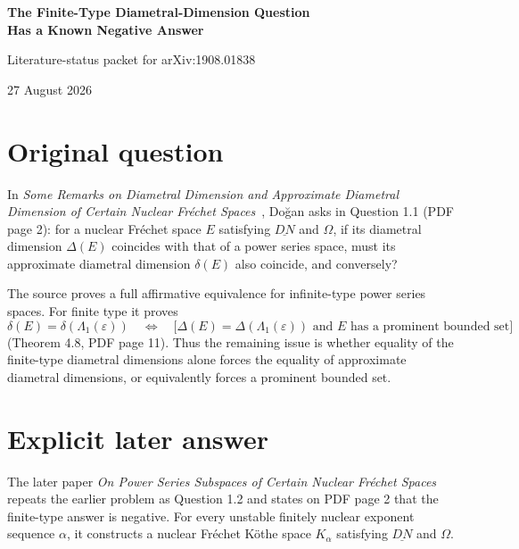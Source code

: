 \documentclass[10pt]{article}
\newcommand{\DN}{\underline{DN}}
\newcommand{\Om}{\Omega}
\begin{document}
\begin{center}
{\LARGE\bfseries The Finite-Type Diametral-Dimension Question\\[2pt]
Has a Known Negative Answer\par}
\vspace{8pt}
{\large Literature-status packet for arXiv:1908.01838\par}
\vspace{3pt}
27 August 2026
\end{center}
\vspace{3pt}

\begin{center}
\end{center}

\section{Original question}

In \emph{Some Remarks on Diametral Dimension and Approximate Diametral
Dimension of Certain Nuclear Fr\'echet Spaces}~\cite{source}, Do\u{g}an asks
in Question 1.1 (PDF page 2): for a nuclear Fr\'echet space $E$ satisfying
$\DN$ and $\Om$, if its diametral dimension $\Delta(E)$ coincides with that
of a power series space, must its approximate diametral dimension $\delta(E)$
also coincide, and conversely?

The source proves a full affirmative equivalence for infinite-type power
series spaces. For finite type it proves
\[
 \delta(E)=\delta(\Lambda_1(\varepsilon))
 \quad\Longleftrightarrow\quad
 \bigl[\Delta(E)=\Delta(\Lambda_1(\varepsilon))
 \text{ and $E$ has a prominent bounded set}\bigr]
\]
(Theorem 4.8, PDF page 11). Thus the remaining issue is whether equality of
the finite-type diametral dimensions alone forces the equality of approximate
diametral dimensions, or equivalently forces a prominent bounded set.

\section{Explicit later answer}

The later paper \emph{On Power Series Subspaces of Certain Nuclear Fr\'echet
Spaces}~\cite{answer} repeats the earlier problem as Question 1.2 and states
on PDF page 2 that the finite-type answer is negative. For every unstable
finitely nuclear exponent sequence $\alpha$, it constructs a nuclear
Fr\'echet K\"othe space $K_\alpha$ satisfying $\DN$ and $\Om$.
\end{document}

